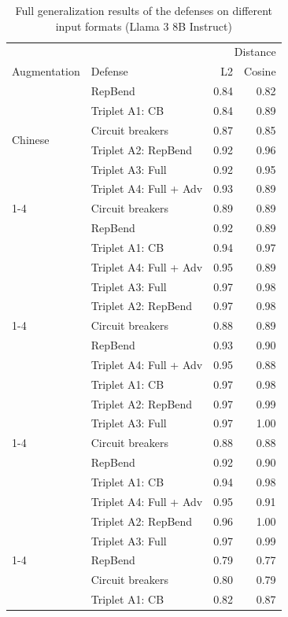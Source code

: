 \documentclass[11pt]{article}
\begin{document}
\begin{table}
\centering
\caption{Full generalization results of the defenses on different input formats (Llama 3 8B Instruct)}
\label{tab:genresults}
  \begin{tabular}{llrr}
\hline
 &  & \multicolumn{2}{r}{Distance} \\
Augmentation & Defense & L2 & Cosine \\
\hline
\multirow[t]{6}{*}{Chinese} & RepBend & 0.84 & 0.82 \\
 & Triplet A1: CB & 0.84 & 0.89 \\
 & Circuit breakers & 0.87 & 0.85 \\
 & Triplet A2: RepBend & 0.92 & 0.96 \\
 & Triplet A3: Full & 0.92 & 0.95 \\
 & Triplet A4: Full + Adv & 0.93 & 0.89 \\
\cline{1-4}
\multirow[t]{6}{*}{French} & Circuit breakers & 0.89 & 0.89 \\
 & RepBend & 0.92 & 0.89 \\
 & Triplet A1: CB & 0.94 & 0.97 \\
 & Triplet A4: Full + Adv & 0.95 & 0.89 \\
 & Triplet A3: Full & 0.97 & 0.98 \\
 & Triplet A2: RepBend & 0.97 & 0.98 \\
\cline{1-4}
\multirow[t]{6}{*}{German} & Circuit breakers & 0.88 & 0.89 \\
 & RepBend & 0.93 & 0.90 \\
 & Triplet A4: Full + Adv & 0.95 & 0.88 \\
 & Triplet A1: CB & 0.97 & 0.98 \\
 & Triplet A2: RepBend & 0.97 & 0.99 \\
 & Triplet A3: Full & 0.97 & 1.00 \\
\cline{1-4}
\multirow[t]{6}{*}{Spanish} & Circuit breakers & 0.88 & 0.88 \\
 & RepBend & 0.92 & 0.90 \\
 & Triplet A1: CB & 0.94 & 0.98 \\
 & Triplet A4: Full + Adv & 0.95 & 0.91 \\
 & Triplet A2: RepBend & 0.96 & 1.00 \\
 & Triplet A3: Full & 0.97 & 0.99 \\
\cline{1-4}
\multirow[t]{6}{*}{Ukrainian} & RepBend & 0.79 & 0.77 \\
 & Circuit breakers & 0.80 & 0.79 \\
 & Triplet A1: CB & 0.82 & 0.87 \\

\end{tabular}
\end{table}
\end{document}
